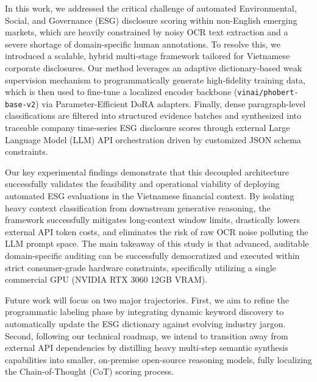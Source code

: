 \documentclass{article}
\theoremstyle{plain}
\theoremstyle{definition}
\theoremstyle{remark}
\begin{document}
\begin{center}
\color{red}
\noindent{}
\end{center}

In this work, we addressed the critical challenge of automated Environmental, Social, and Governance (ESG) disclosure scoring within non-English emerging markets, which are heavily constrained by noisy OCR text extraction and a severe shortage of domain-specific human annotations. To resolve this, we introduced a scalable, hybrid multi-stage framework tailored for Vietnamese corporate disclosures. Our method leverages an adaptive dictionary-based weak supervision mechanism to programmatically generate high-fidelity training data, which is then used to fine-tune a localized encoder backbone (\texttt{vinai/phobert-base-v2}) via Parameter-Efficient DoRA adapters. Finally, dense paragraph-level classifications are filtered into structured evidence batches and synthesized into traceable company time-series ESG disclosure scores through external Large Language Model (LLM) API orchestration driven by customized JSON schema constraints.

Our key experimental findings demonstrate that this decoupled architecture successfully validates the feasibility and operational viability of deploying automated ESG evaluations in the Vietnamese financial context. By isolating heavy context classification from downstream generative reasoning, the framework successfully mitigates long-context window limits, drastically lowers external API token costs, and eliminates the risk of raw OCR noise polluting the LLM prompt space. The main takeaway of this study is that advanced, auditable domain-specific auditing can be successfully democratized and executed within strict consumer-grade hardware constraints, specifically utilizing a single commercial GPU (NVIDIA RTX 3060 12GB VRAM).

Future work will focus on two major trajectories. First, we aim to refine the programmatic labeling phase by integrating dynamic keyword discovery to automatically update the ESG dictionary against evolving industry jargon. Second, following our technical roadmap, we intend to transition away from external API dependencies by distilling heavy multi-step semantic synthesis capabilities into smaller, on-premise open-source reasoning models, fully localizing the Chain-of-Thought (CoT) scoring process.
\end{document}

